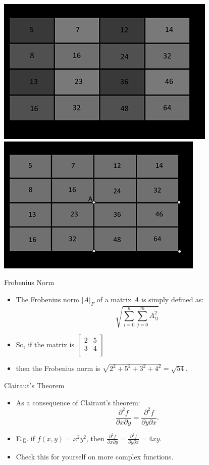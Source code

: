 \documentclass[xcolor=dvipsnames]{beamer}
\begin{document}
\begin{frame}
 \begin{center}
 \includegraphics[width=.45\textwidth]{imgs/ii-dup.png}
 \includegraphics[width=.45\textwidth]{imgs/ii-final.png}
 \end{center}
\end{frame}

\begin{frame}[label=math-frobenius]{Frobenius Norm}
\begin{itemize} 
\item The Frobenius norm $|A|_F$ of a matrix $A$ is simply defined as:
\begin{equation}
 \sqrt{\sum_{i=0}^n \sum_{j=0}^m A_{ij}^2}
\end{equation}
\item So, if the matrix is 
 $
 \begin{bmatrix}
  2 & 5 \\
  3 & 4 \\
 \end{bmatrix}
 $
\item then the Frobenius norm is 
 $\sqrt{2^2 + 5^2 + 3^2 + 4^2} = \sqrt{54}$.
\end{itemize} 
\end{frame}

\begin{frame}[label=math-clairaut]{Clairaut's Theorem}
 \begin{itemize} 
  \item As a consequence of Clairaut's theorem:
 \begin{equation}
  \frac{\partial^2 f}{\partial x \partial y} = 
  \frac{\partial^2 f}{\partial y \partial x}.
 \end{equation}
 \item E.g. if $f(x,y) = x^2y^2$, then
  $\frac{\partial^2 f}{\partial x \partial y} = 
   \frac{\partial^2 f}{\partial y \partial x} =
  4xy$.
 \item Check this for yourself on more complex functions.
 \end{itemize} 
\end{frame}
\end{document}
